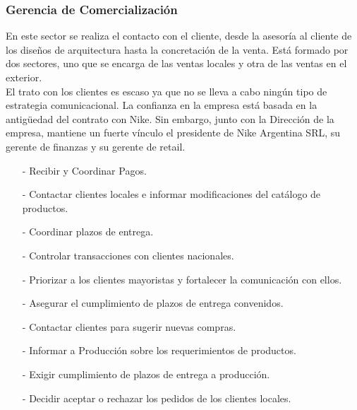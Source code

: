 \documentclass[a4paper,10pt,titlepage]{article}
\begin{document}

\newpage

\subsubsection{Gerencia de Comercializaci\'on}

En este sector se realiza el contacto con el cliente, desde la asesor\'ia al cliente de los dise\~nos de arquitectura 
hasta la concretaci\'on de la venta. Est\'a formado por dos sectores, uno que se encarga de las ventas locales y otra
de las ventas en el exterior.\\
El trato con los clientes es escaso ya que no se lleva a cabo ning\'un tipo de estrategia comunicacional. La confianza 
en la empresa est\'a basada en la antig\"uedad del contrato con Nike. Sin embargo, junto con la Direcci\'on de 
la empresa, mantiene un fuerte v\'inculo el presidente de Nike Argentina SRL, su gerente de finanzas y su gerente de retail.
\smallskip

{
    \begin{itemize}
	\item[-] Recibir y Coordinar Pagos.
	\item[-] Contactar clientes locales e informar modificaciones del cat\'alogo de productos. 
	\item[-] Coordinar plazos de entrega.
	\item[-] Controlar transacciones con clientes nacionales.
    \end{itemize}
}
{
    \begin{itemize}
	\item[-] Priorizar a los clientes mayoristas y fortalecer la comunicaci\'on con ellos.
	\item[-] Asegurar el cumplimiento de plazos de entrega convenidos.
	\item[-] Contactar clientes para sugerir nuevas compras.
	\item[-] Informar a Producci\'on sobre los requerimientos de productos.
    \end{itemize}
}
{
      \begin{itemize}
	\item[-] Exigir cumplimiento de plazos de entrega a producci\'on.
	\item[-] Decidir aceptar o rechazar los pedidos de los clientes locales.
      \end{itemize}
}
\end{document}
